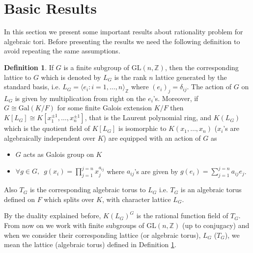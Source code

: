 \documentclass{article}
\theoremstyle{plain}
\theoremstyle{definition}
\newtheorem{definition}[theorem]{Definition}
\newcommand{\Z}{\ensuremath{\mathbb{Z}}}
\newcommand{\G}{G}
\newcommand{\glat}{$G$-lattice}
\begin{document}
\section{Basic Results}
In this section we present some important results about rationality problem for algebraic tori. Before presenting the results we need the following definition to avoid repeating the same assumptions.
\begin{definition}\label{Assumption}
If $G$ is a finite subgroup of $\mathrm{GL}(n,\Z)$, then the corresponding lattice to $G$ which is denoted by $L_G$ is the rank $n$ lattice generated by the standard basis, i.e. $L_G = \langle e_i : i  = 1, \ldots, n \rangle_\Z$ where $(e_i)_j = \delta_{ij}$. The action of $G$ on $L_G$ is given by multiplication from right on the $e_i$'s. Moreover, if $G \cong \mathrm{Gal}(K/F)$ for some finite Galois extension $K/F$ then $K[L_G] \cong K[x^{\pm 1}_1, \ldots , x^{\pm 1}_n]$, that is the Laurent polynomial ring, and $K(L_G)$ which is the quotient field of $K[L_G]$ is isomorphic to $K(x_1, \ldots , x_n)$ ($x_i$'s are algebraically independent over $K$) are equipped with an action of $G$ as
\begin{itemize}
\item $G$ acts as Galois group on $K$ 
\item $\forall g \in G, \,\,\, g(x_i) = \prod_{j=1}^{j=n} x_j^{a_{ij}}$  where $a_{ij}$'s are given by $g(e_i) = \sum_{j=1}^{j=n} a_{ij}e_j$.
\end{itemize}
Also $T_G$ is the corresponding algebraic torus to $L_G$ i.e. $T_G$ is an algebraic torus defined on $F$ which splits over $K$, with character lattice $L_G$. 
\end{definition}
\noindent
By the duality explained before, $K(L_G)^G$ is the rational function field of $T_G$. From now on we work with finite subgroups of $\mathrm{GL}(n,\Z)$ (up to conjugacy) and when we consider their corresponding lattice (or algebraic torus), $L_G$ ($T_G$), we mean the lattice (algebraic torus) defined in Definition \ref{Assumption}. 
%
\end{document}
